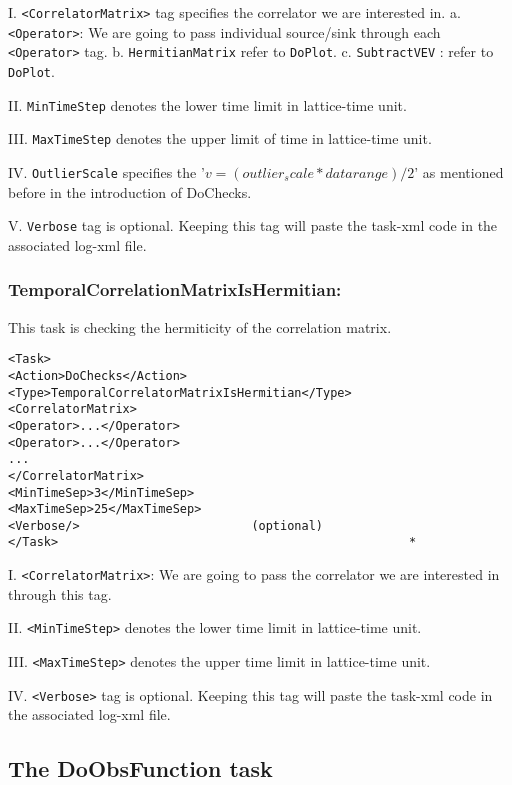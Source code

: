 \documentclass[12pt]{article}
\newcommand{\vb}{\texttt}
\begin{document}
I. \vb{<CorrelatorMatrix>} tag specifies the correlator we are interested in.
a. \vb{<Operator>}: We are going to pass individual source/sink through each \vb{<Operator>} tag.
b. \vb{HermitianMatrix} refer to \vb{DoPlot}.
c. \vb{SubtractVEV} : refer to \vb{DoPlot}.

II. \vb{MinTimeStep} denotes  the lower time limit in lattice-time unit.

III. \vb{MaxTimeStep} denotes the upper limit of time in lattice-time unit.

IV. \vb{OutlierScale} specifies the '$v = (outlier_scale *data range)/2$' as mentioned before in the introduction of DoChecks.

V. \vb{Verbose} tag is optional. Keeping this tag will paste the task-xml code in the associated log-xml file.


\subsubsection{TemporalCorrelationMatrixIsHermitian:}
This task is checking the hermiticity of the correlation matrix.

\begin{verbatim}
<Task>
<Action>DoChecks</Action>
<Type>TemporalCorrelatorMatrixIsHermitian</Type>
<CorrelatorMatrix>
<Operator>...</Operator>
<Operator>...</Operator>
...
</CorrelatorMatrix>
<MinTimeSep>3</MinTimeSep>
<MaxTimeSep>25</MaxTimeSep>
<Verbose/>                        (optional) 
</Task>    											    *
\end{verbatim}
I. \vb{<CorrelatorMatrix>}: We are going to pass the correlator we are interested in through this tag.

II. \vb{<MinTimeStep>} denotes  the lower time limit in lattice-time unit.

III. \vb{<MaxTimeStep>} denotes the upper time limit in lattice-time unit.

IV. \vb{<Verbose>} tag is optional. Keeping this tag will paste the task-xml code in the associated log-xml file.

\subsection{The DoObsFunction task}
\end{document}
